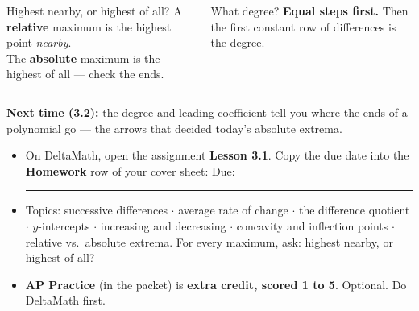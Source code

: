 \documentclass[aspectratio=169, 11pt]{beamer}
\begin{document}
\begin{frame}[t, plain]

  \begin{columns}[T]
      \begin{block}{Highest nearby, or highest of all?}
        A \textbf{relative} maximum is the highest point \emph{nearby}.\\[3pt]
        The \textbf{absolute} maximum is the highest of all --- check the ends.
      \end{block}
      \begin{block}{What degree?}
        \textbf{Equal steps first.} Then the first constant row of differences is the
        degree.
      \end{block}
  \end{columns}

  \bigskip
  \textbf{Next time (3.2):} the degree and leading coefficient tell you where the ends of a
  polynomial go --- the arrows that decided today's absolute extrema.
\end{frame}

\begin{frame}[t, plain]

  \begin{itemize}\setlength{\itemsep}{8pt}
    \item On DeltaMath, open the assignment \textbf{Lesson 3.1}. Copy the due date into the
          \textbf{Homework} row of your cover sheet: \quad Due: \rule{3cm}{0.4pt}
    \item Topics: successive differences $\cdot$ average rate of change $\cdot$ the difference
          quotient $\cdot$ $y$-intercepts $\cdot$ increasing and decreasing $\cdot$ concavity and
          inflection points $\cdot$ relative vs.\ absolute extrema. For every maximum, ask:
          highest nearby, or highest of all?
    \item \textbf{AP Practice} (in the packet) is \textbf{extra credit, scored 1 to 5}. Optional.
          Do DeltaMath first.
  \end{itemize}
\end{frame}
\end{document}
